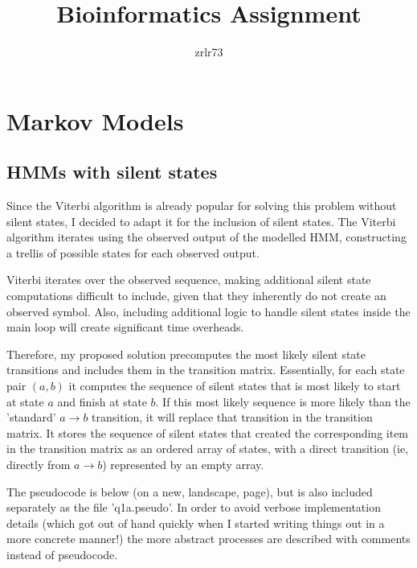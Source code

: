 \documentclass[11pt]{article} %
\title{\vspace{-1.6cm}Bioinformatics Assignment}
\author{zrlr73}
\date{} %
\begin{document}
\maketitle

\section{Markov Models}
\subsection{HMMs with silent states}
Since the Viterbi algorithm is already popular for solving this problem without silent states, I decided to adapt it for the inclusion of silent states. The Viterbi algorithm iterates using the observed output of the modelled HMM, constructing a trellis of possible states for each observed output.

Viterbi iterates over the observed sequence, making additional silent state computations difficult to include, given that they inherently do not create an observed symbol. Also, including additional logic to handle silent states inside the main loop will create significant time overheads.

Therefore, my proposed solution precomputes the most likely silent state transitions and includes them in the transition matrix. Essentially, for each state pair $(a, b)$ it computes the sequence of silent states that is most likely to start at state $a$ and finish at state $b$. If this most likely sequence is more likely than the 'standard' $a \rightarrow b$ transition, it will replace that transition in the transition matrix. It stores the sequence of silent states that created the corresponding item in the transition matrix as an ordered array of states, with a direct transition (ie, directly from $a \rightarrow b$) represented by an empty array.

The pseudocode is below (on a new, landscape, page), but is also included separately as the file 'q1a.pseudo'. In order to avoid verbose implementation details (which got out of hand quickly when I started writing things out in a more concrete manner!) the more abstract processes are described with comments instead of pseudocode.

\hfill
\end{document}
